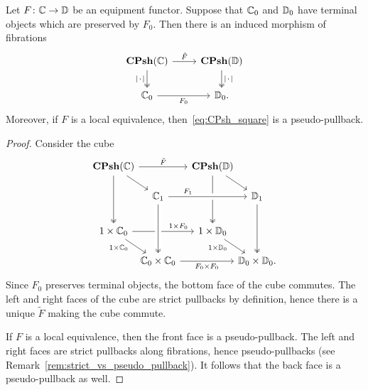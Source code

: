 \documentclass[11pt,oneside,article]{memoir}
\begin{document}
\begin{lemma}
      \label{lem:Psh_pullback}
   Let $F\colon\mathbb{C}\to\mathbb{D}$ be an equipment functor. Suppose that $\mathbb{C}_0$ and
   $\mathbb{D}_0$ have terminal objects which are preserved by $F_0$. Then there is an induced
   morphism of fibrations
   \begin{equation} \begin{tikzcd}
         \label{eq:CPsh_square}
      \CPsh(\dcat{C}) \ar[r,"\tilde{F}"] \ar[d,two heads,"\MOb"'] %
         & \CPsh(\dcat{D}) \ar[d,two heads,"\MOb"] \\
      \dcat{C}_0 \ar[r,"F_0"']
         & \dcat{D}_0.
   \end{tikzcd} \end{equation}
   Moreover, if $F$ is a local equivalence, then~\eqref{eq:CPsh_square} is a pseudo-pullback.
\end{lemma}
\begin{proof}
   Consider the cube
   \[ \begin{tikzcd}[row sep={35,between origins}, column sep={55,between origins}]
      \CPsh(\dcat{C}) \ar[rr,"\tilde{F}"] \ar[dr] \ar[dd,two heads]
      &[-10] & \CPsh(\dcat{D}) \ar[dd,two heads] \ar[dr] &[-10] \\[-5]
      & \dcat{C}_1 \ar[rr,crossing over,"F_1" near start]
         && \dcat{D}_1 \ar[dd,two heads] \\
      1\times\dcat{C}_0 \ar[rr,"1\times F_0" pos=.75]
            \ar[dr,"1\times\dcat{C}_0"' {pos=.25,inner sep=2pt}]
         && 1\times\dcat{D}_0 \ar[dr,"1\times\dcat{D}_0"' {pos=.25,inner sep=2pt}] & \\[-5]
      & \dcat{C}_0\times\dcat{C}_0 \ar[rr,"F_0\times F_0"']
            \ar[from=uu,crossing over,two heads]
         && \dcat{D}_0\times\dcat{D}_0.
   \end{tikzcd} \]
   Since $F_0$ preserves terminal objects, the bottom face of the cube commutes. The left and right faces of
   the cube are strict pullbacks by definition, hence there is a unique $\tilde{F}$ making the cube commute.

   If $F$ is a local equivalence, then the front face is a pseudo-pullback. The left and right faces
   are strict pullbacks along fibrations, hence pseudo-pullbacks (see Remark~\ref{rem:strict_vs_pseudo_pullback}). It follows that the
   back face is a pseudo-pullback as well.
\end{proof}
\end{document}
